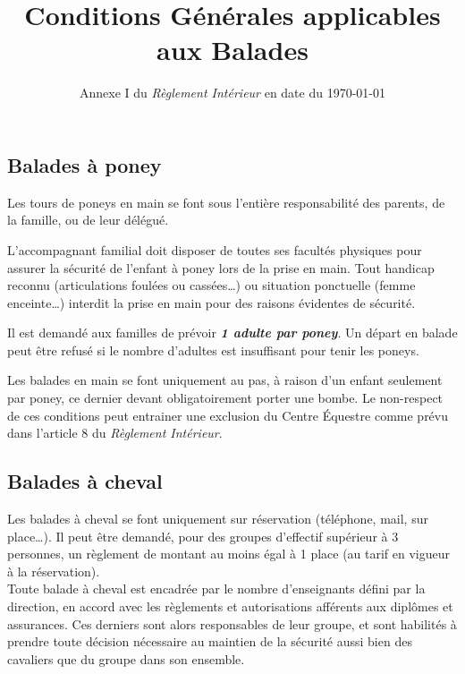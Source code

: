 \documentclass[11pt,a4paper]{article}
\title[Conditions Générales applicables aux Balades \\ version du \today]{Conditions Générales applicables aux Balades}
\subtitle{Annexe I du \textit{Règlement Intérieur} en date du \today}
\author{}
\date{}
\renewcommand{\emph}[1]{\textit{\textbf{#1}}}
\begin{document}
   \maketitle

   \vspace{-30pt}

   \subsection*{Balades à poney}
      Les tours de poneys en main se font sous l'entière responsabilité des parents, de la famille, ou de leur délégué.

      L'accompagnant familial doit disposer de toutes ses facultés physiques pour assurer la sécurité de l'enfant à poney lors de la prise en main.
      Tout handicap reconnu (articulations foulées ou cassées\dots) ou situation ponctuelle (femme enceinte\dots) interdit la prise en main pour des raisons évidentes de sécurité.

      Il est demandé aux familles de prévoir \emph{1 adulte par poney}.
      Un départ en balade peut être refusé si le nombre d'adultes est insuffisant pour tenir les poneys.

      Les balades en main se font uniquement au pas, à raison d'un enfant seulement par poney, ce dernier devant obligatoirement porter une bombe.
      Le non-respect de ces conditions peut entrainer une exclusion du Centre Équestre comme prévu dans l'article 8 du \textit{Règlement Intérieur}.

   \subsection*{Balades à cheval}
      Les balades à cheval se font uniquement sur réservation (téléphone, mail, sur place\dots).
      Il peut être demandé, pour des groupes d'effectif supérieur à 3 personnes, un règlement de montant au moins égal à 1 place (au tarif en vigueur à la réservation).
      \\

      Toute balade à cheval est encadrée par le nombre d'enseignants défini par la direction, en accord avec les règlements et autorisations afférents aux diplômes et assurances.
      Ces derniers sont alors responsables de leur groupe, et sont habilités à prendre toute décision nécessaire au maintien de la sécurité aussi bien des cavaliers que du groupe dans son ensemble.
      \\
\end{document}
